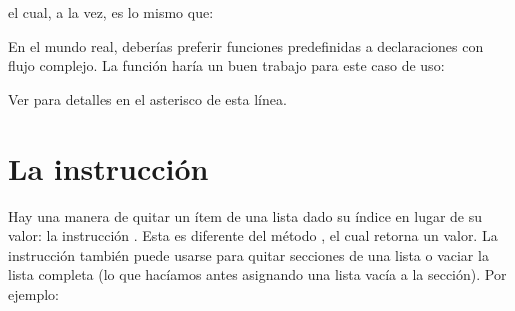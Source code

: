 \documentclass[a5paper,10pt,spanish]{sphinxmanual}
\begin{document}
\sphinxAtStartPar
el cual, a la vez, es lo mismo que:

\begin{sphinxVerbatim}[commandchars=\\\{\}]
  \PYG{p}{[}\PYG{p}{]}
   
    
      \PYG{p}{[}\PYG{p}{]}
       
        \PYG{p}{[}\PYG{p}{]}
    
\end{sphinxVerbatim}

\sphinxAtStartPar
En el mundo real, deberías preferir funciones predefinidas a declaraciones con flujo complejo.  La función  haría un buen trabajo para este caso de uso:

\begin{sphinxVerbatim}[commandchars=\\\{\}]
\end{sphinxVerbatim}

\sphinxAtStartPar
Ver {\hyperref[\detokenize{tutorial/controlflow:tut-unpacking-arguments}]{}} para detalles en el asterisco de esta línea.


\section{La instrucción }
\label{\detokenize{tutorial/datastructures:the-del-statement}}\label{\detokenize{tutorial/datastructures:tut-del}}
\sphinxAtStartPar
Hay una manera de quitar un ítem de una lista dado su índice en lugar de su valor: la instrucción .  Esta es diferente del método , el cual retorna un valor.  La instrucción  también puede usarse para quitar secciones de una lista o vaciar la lista completa (lo que hacíamos antes asignando una lista vacía a la sección).  Por ejemplo:
\end{document}
